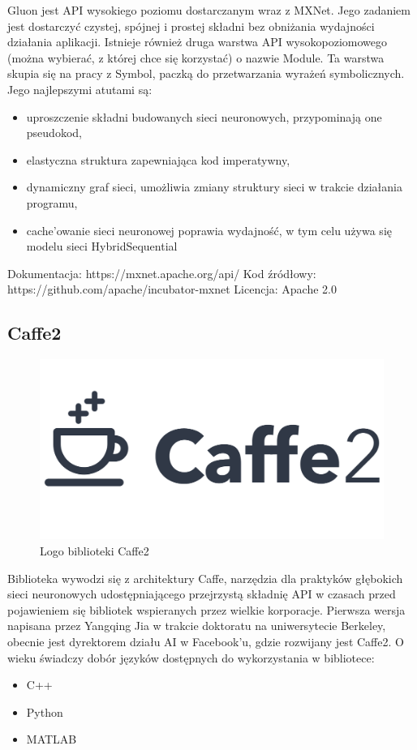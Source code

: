 \documentclass[12pt,a4paper,twoside,titlepage,openright]{book}
\begin{document}
Gluon jest API wysokiego poziomu dostarczanym wraz z MXNet. Jego zadaniem jest dostarczyć czystej, spójnej i prostej składni bez obniżania wydajności działania aplikacji. Istnieje również druga warstwa API wysokopoziomowego (można wybierać, z której chce się korzystać) o nazwie Module. Ta warstwa skupia się na pracy z Symbol, paczką do przetwarzania wyrażeń symbolicznych.\cite{DBLP:journals/corr/ChenLLLWWXXZZ15} Jego najlepszymi atutami są:
\begin{itemize}
\item uproszczenie składni budowanych sieci neuronowych, przypominają one pseudokod,
\item elastyczna struktura zapewniająca kod imperatywny,
\item dynamiczny graf sieci, umożliwia zmiany struktury sieci w trakcie działania programu,
\item cache'owanie sieci neuronowej poprawia wydajność, w tym celu używa się modelu sieci HybridSequential
\end{itemize}

\noindent 
\newline
Dokumentacja: https://mxnet.apache.org/api/
\newline
Kod źródłowy: https://github.com/apache/incubator-mxnet
\newline
Licencja: Apache 2.0

\subsection{Caffe2}
\begin{figure}[h]
	\centering
			\includegraphics[resolution=100, scale=0.35]{Caffe2.png}
		\caption{Logo biblioteki Caffe2}
\end{figure}
Biblioteka wywodzi się z architektury Caffe, narzędzia dla praktyków głębokich sieci neuronowych udostępniającego przejrzystą składnię API w czasach przed pojawieniem się bibliotek wspieranych przez wielkie korporacje. Pierwsza wersja napisana przez Yangqing Jia w trakcie doktoratu na uniwersytecie Berkeley, obecnie jest dyrektorem działu AI w Facebook'u, gdzie rozwijany jest Caffe2. \cite{jia2014caffe} O wieku świadczy dobór języków dostępnych do wykorzystania w bibliotece:
\begin{itemize}
\item C++
\item Python
\item MATLAB
\end{itemize}
\end{document}
